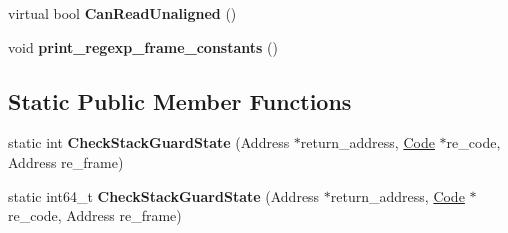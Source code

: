 \begin{DoxyCompactItemize}
\item 
virtual bool {\bfseries Can\+Read\+Unaligned} ()\hypertarget{classv8_1_1internal_1_1_reg_exp_macro_assembler_m_i_p_s_adc3f178837a4dedd136bb43cbdebc165}{}\label{classv8_1_1internal_1_1_reg_exp_macro_assembler_m_i_p_s_adc3f178837a4dedd136bb43cbdebc165}

\item 
void {\bfseries print\+\_\+regexp\+\_\+frame\+\_\+constants} ()\hypertarget{classv8_1_1internal_1_1_reg_exp_macro_assembler_m_i_p_s_a21ca4a1bae5e0a36e398659f62673b02}{}\label{classv8_1_1internal_1_1_reg_exp_macro_assembler_m_i_p_s_a21ca4a1bae5e0a36e398659f62673b02}

\end{DoxyCompactItemize}
\subsection*{Static Public Member Functions}
\begin{DoxyCompactItemize}
\item 
static int {\bfseries Check\+Stack\+Guard\+State} (Address $\ast$return\+\_\+address, \hyperlink{classv8_1_1internal_1_1_code}{Code} $\ast$re\+\_\+code, Address re\+\_\+frame)\hypertarget{classv8_1_1internal_1_1_reg_exp_macro_assembler_m_i_p_s_ab8aac27f8f15e668bddeca079c0219d8}{}\label{classv8_1_1internal_1_1_reg_exp_macro_assembler_m_i_p_s_ab8aac27f8f15e668bddeca079c0219d8}

\item 
static int64\+\_\+t {\bfseries Check\+Stack\+Guard\+State} (Address $\ast$return\+\_\+address, \hyperlink{classv8_1_1internal_1_1_code}{Code} $\ast$re\+\_\+code, Address re\+\_\+frame)\hypertarget{classv8_1_1internal_1_1_reg_exp_macro_assembler_m_i_p_s_ad68d171cbc95c86f278f8f1e5f7f2d9d}{}\label{classv8_1_1internal_1_1_reg_exp_macro_assembler_m_i_p_s_ad68d171cbc95c86f278f8f1e5f7f2d9d}

\end{DoxyCompactItemize}
